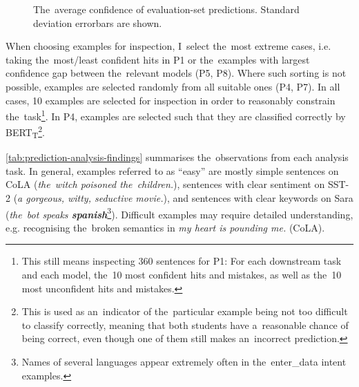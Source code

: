 \documentclass[bsc,frontabs,singlespacing,parskip,deptreport]{infthesis}
\def\BERTT{BERT\textsubscript{T}}
\begin{document}
{{    \begin{figure}[h!tb]
      \centering
      \caption{The~average confidence of evaluation-set predictions. Standard deviation errorbars are shown.}
      \label{fig:prediction-analysis-avg-confidence}
    \end{figure}

    When choosing examples for inspection, I~select the~most extreme cases, i.e. taking the~most/least confident hits in P1 or the~examples with largest confidence gap between the~relevant models (P5, P8).
    Where such sorting is not possible, examples are selected randomly from all suitable ones (P4, P7).
    In all cases, 10 examples are selected for inspection in order to reasonably constrain the~task\footnote{This still means inspecting 360 sentences for P1: For each downstream task and each model, the~10 most confident hits and mistakes, as well as the~10 most unconfident hits and mistakes.}.
    In P4, examples are selected such that they are classified correctly by \BERTT\footnote{This is used as an~indicator of the~particular example being not too difficult to classify correctly, meaning that both students have a~reasonable chance of being correct, even though one of them still makes an~incorrect prediction.}.

    \autoref{tab:prediction-analysis-findings} summarises the~observations from each analysis task. In general, examples referred to as ``easy'' are mostly simple sentences on CoLA (\textit{the~witch poisoned the~children.}), sentences with clear sentiment on SST-2 (\textit{a gorgeous, witty, seductive movie.}), and sentences with clear keywords on Sara (\textit{the~bot speaks \textbf{spanish}}\footnote{Names of several languages appear extremely often in the~enter\_data intent examples.}). Difficult examples may require detailed understanding, e.g. recognising the~broken semantics in \textit{my heart is pounding me.} (CoLA).

}}
\end{document}
